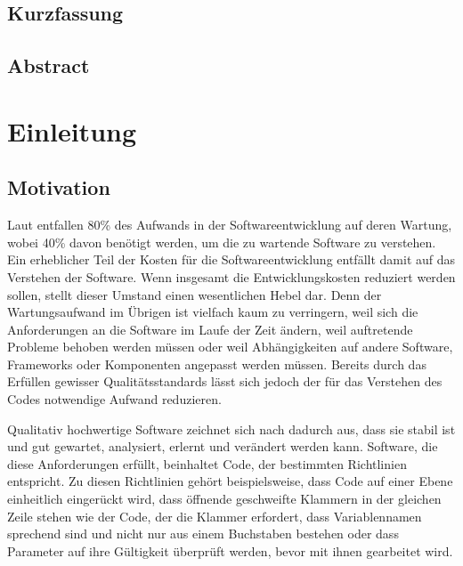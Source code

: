 \documentclass[
	oneside,  %
	ngerman, 
	final, 
	11pt, 
	a4paper, 
	1.1headlines, 
	headinclude=false, 
	footinclude=false, 
	mpinclude=false, 
	pagesize, 
	onecolumn, 
	titlepage, 
	parskip=half, 
	headsepline, 
	chapterprefix=false, 
	version=first, 
	listof=totoc, 
	bibliography=totoc, 
	toc=graduated, 
	fleqn
]{scrbook}
\begin{document}
\section*{\thispagestyle{empty}Kurzfassung}
\lipsum[1-2]

\newpage{}

\section*{\thispagestyle{empty}Abstract}		
\lipsum[1-2]

\newpage{}

\setcounter{page}{1}
\tableofcontents
		
\newpage{}
		
\setcounter{page}{1} 



\chapter{Einleitung}
\label{Einleitung}

		
\section{Motivation}
\label{Motivation}
Laut \cite{Balzert2009} entfallen 80\% des Aufwands in der Softwareentwicklung auf deren Wartung, wobei 40\% davon benötigt werden, um die zu wartende Software zu verstehen.
Ein erheblicher Teil der Kosten für die Softwareentwicklung entfällt damit auf das Verstehen der Software.
Wenn insgesamt die Entwicklungskosten reduziert werden sollen, stellt dieser Umstand einen wesentlichen Hebel dar.
Denn der Wartungsaufwand im Übrigen ist vielfach kaum zu verringern, weil sich die Anforderungen an die Software im Laufe der Zeit ändern, weil auftretende Probleme behoben werden müssen oder weil Abhängigkeiten auf andere Software, Frameworks oder Komponenten angepasst werden müssen.
Bereits durch das Erfüllen gewisser Qualitätsstandards lässt sich jedoch der für das Verstehen des Codes notwendige Aufwand reduzieren.

Qualitativ hochwertige Software zeichnet sich nach \cite{ISO-25010} dadurch aus, dass sie stabil ist und gut gewartet, analysiert, erlernt und verändert werden kann.
Software, die diese Anforderungen erfüllt, beinhaltet Code, der bestimmten Richtlinien entspricht.
Zu diesen Richtlinien gehört beispielsweise, dass Code auf einer Ebene einheitlich eingerückt wird, dass öffnende geschweifte Klammern in der gleichen Zeile stehen wie der Code, der die Klammer erfordert, dass Variablennamen sprechend sind und nicht nur aus einem Buchstaben bestehen oder dass Parameter auf ihre Gültigkeit überprüft werden, bevor mit ihnen gearbeitet wird.
\end{document}
